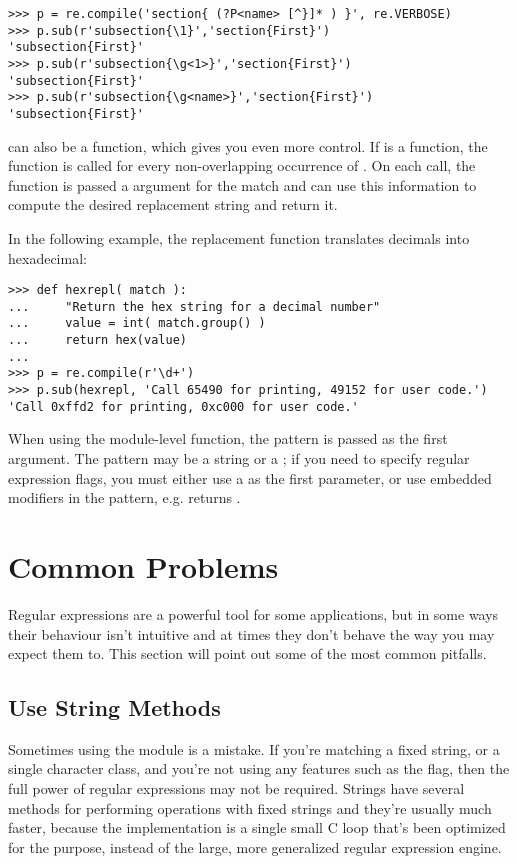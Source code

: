 \documentclass{howto}
\begin{document}
\begin{verbatim}
>>> p = re.compile('section{ (?P<name> [^}]* ) }', re.VERBOSE)
>>> p.sub(r'subsection{\1}','section{First}')
'subsection{First}'
>>> p.sub(r'subsection{\g<1>}','section{First}')
'subsection{First}'
>>> p.sub(r'subsection{\g<name>}','section{First}')
'subsection{First}'
\end{verbatim}

 can also be a function, which gives you even more
control.  If  is a function, the function is
called for every non-overlapping occurrence of .  On each
call, the function is 
passed a  argument for the match
and can use this information to compute the desired replacement string and return it.

In the following example, the replacement function translates 
decimals into hexadecimal:

\begin{verbatim}
>>> def hexrepl( match ):
...     "Return the hex string for a decimal number"
...     value = int( match.group() )
...     return hex(value)
...
>>> p = re.compile(r'\d+')
>>> p.sub(hexrepl, 'Call 65490 for printing, 49152 for user code.')
'Call 0xffd2 for printing, 0xc000 for user code.'
\end{verbatim}

When using the module-level  function, the pattern
is passed as the first argument.  The pattern may be a string or a
; if you need to specify regular expression flags,
you must either use a  as the first parameter, or use
embedded modifiers in the pattern, e.g.   returns .

\section{Common Problems}

Regular expressions are a powerful tool for some applications, but in
some ways their behaviour isn't intuitive and at times they don't
behave the way you may expect them to.  This section will point out
some of the most common pitfalls.

\subsection{Use String Methods}

Sometimes using the  module is a mistake.  If you're
matching a fixed string, or a single character class, and you're not
using any  features such as the  flag,
then the full power of regular expressions may not be required.
Strings have several methods for performing operations with fixed
strings and they're usually much faster, because the implementation is
a single small C loop that's been optimized for the purpose, instead
of the large, more generalized regular expression engine.
\end{document}

